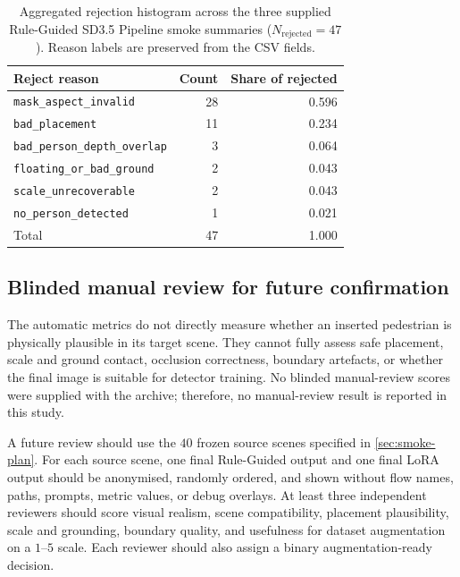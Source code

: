 \documentclass[11pt,a4paper]{article}
\newcommand{\rgp}{Rule-Guided SD3.5 Pipeline\xspace}  %
\begin{document}
\begin{table}[t]
  \centering
  \caption[Aggregated rule-guided rejection histogram]{Aggregated rejection
  histogram across the three supplied \rgp smoke summaries
  ($N_{\mathrm{rejected}}=47$). Reason labels are preserved from the CSV fields.}
  \label{tab:rejecthist}
  \scriptsize
  \begin{tabular}{@{}lrr@{}}
    \toprule
    Reject reason & Count & Share of rejected \\
    \midrule
    \texttt{mask\_aspect\_invalid} & 28 & 0.596 \\
    \texttt{bad\_placement} & 11 & 0.234 \\
    \texttt{bad\_person\_depth\_overlap} & 3 & 0.064 \\
    \texttt{floating\_or\_bad\_ground} & 2 & 0.043 \\
    \texttt{scale\_unrecoverable} & 2 & 0.043 \\
    \texttt{no\_person\_detected} & 1 & 0.021 \\
    \midrule
    Total & 47 & 1.000 \\
    \bottomrule
  \end{tabular}
\end{table}


\subsection{Blinded manual review for future confirmation}\label{sec:manualreview}
The automatic metrics do not directly measure whether an inserted pedestrian is physically plausible in its target scene. They cannot fully assess safe placement, scale and ground contact, occlusion correctness, boundary artefacts, or whether the final image is suitable for detector training. No blinded manual-review scores were supplied with the archive; therefore, no manual-review result is reported in this study.

A future review should use the $40$ frozen source scenes specified in \cref{sec:smoke-plan}. For each source scene, one final Rule-Guided output and one final LoRA output should be anonymised, randomly ordered, and shown without flow names, paths, prompts, metric values, or debug overlays. At least three independent reviewers should score visual realism, scene compatibility, placement plausibility, scale and grounding, boundary quality, and usefulness for dataset augmentation on a $1$--$5$ scale. Each reviewer should also assign a binary augmentation-ready decision.
\end{document}
